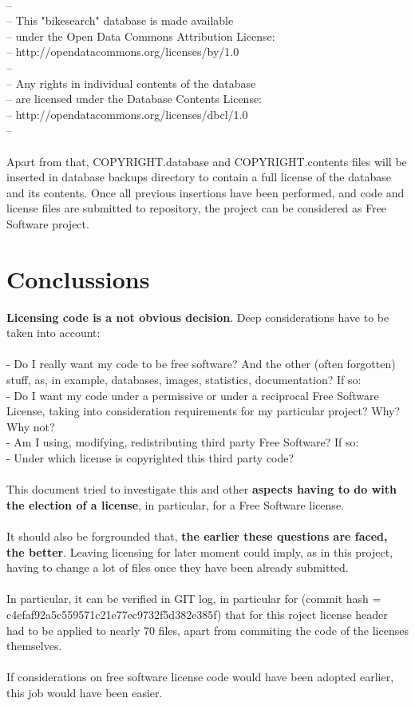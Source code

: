\documentclass[11pt]{article}
\begin{document}
\\
--\\
-- This "bikesearch" database is made available \\
-- under the Open Data Commons Attribution License: \\ 
-- http://opendatacommons.org/licenses/by/1.0 \\
--\\
-- Any rights in individual contents of the database \\
-- are licensed under the Database Contents License: \\
-- http://opendatacommons.org/licenses/dbcl/1.0 \\
--\\
\\
Apart from that, COPYRIGHT.database and COPYRIGHT.contents files will be inserted in database backups directory to contain a full license of the database and its contents. Once all previous insertions have been performed, and code and license files are submitted to repository, the project can be considered as Free Software project.
\newpage
\section{Conclussions}

\textbf{Licensing code is a not obvious decision}. Deep considerations have to be taken into account:\\
\\
- Do I really want my code to be free software? And the other (often forgotten) stuff, as, in example, databases, images, statistics, documentation? If so:\\
- Do I want my code under a permissive or under a reciprocal Free Software License, taking into consideration requirements for my particular project? Why? Why not?\\
- Am I using, modifying, redistributing third party Free Software? If so:\\
- Under which license is copyrighted this third party code?\\
\\
This document tried to investigate this and other \textbf{aspects having to do with the election of a license}, in particular, for a Free Software license.\\
\\
It should also be forgrounded that, \textbf{the earlier these questions are faced, the better}. Leaving licensing for later moment could imply, as in this project, having to change a lot of files once they have been already submitted.\\ 
\\
In particular, it can be verified in GIT log, in particular for (commit hash = c4efaf92a5c559571c21e77ec9732f5d382e385f) that for this roject license header had to be applied to nearly 70 files, apart from commiting the code of the licenses themselves.\\
\\
If considerations on free software license code would have been adopted earlier, this job would have been easier.
\newpage
\end{document}
